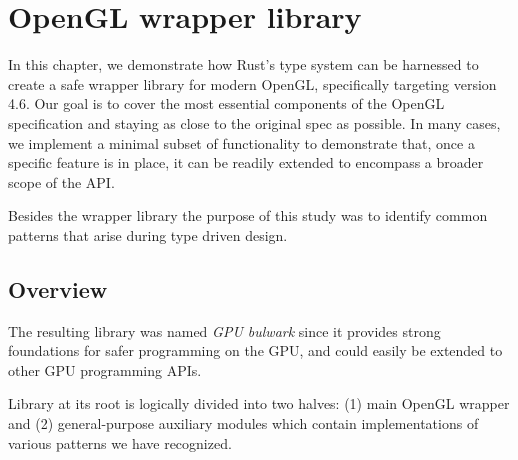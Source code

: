 \chapter{OpenGL wrapper library}

In this chapter, we demonstrate how Rust's type system can be harnessed to create a safe wrapper library for modern OpenGL, specifically targeting version 4.6. Our goal is to cover the most essential components of the OpenGL specification and staying as close to the original spec as possible. 
In many cases, we implement a minimal subset of functionality to demonstrate that, once a specific feature is in place, it can be readily extended to encompass a broader scope of the API.

Besides the wrapper library the purpose of this study was to identify common patterns that arise during type driven design.

\section*{Overview}

The resulting library was named \textit{GPU bulwark} since it provides strong foundations for safer programming on the GPU, and could easily be extended to other GPU programming APIs.

Library at its root is logically divided into two halves: (1) main OpenGL wrapper and (2) general-purpose auxiliary modules which contain implementations of various patterns we have recognized.
%
